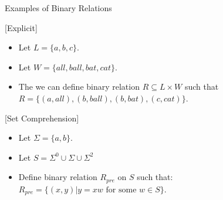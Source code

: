 \documentclass[style=sailor,size=12pt]{powerdot}
\begin{document}
\begin{slide}[bm=,toc=]{Examples of Binary Relations}
\begin{ex}{}[Explicit]~\\
\begin{itemize}
\item Let $L = \{a,b,c\}$.
\item Let $W = \{all,ball,bat,cat\}$.
\item The we can define binary relation $R \subseteq L \times W$ such that 
      $R = \{(a,all),(b,ball),(b, bat), (c,cat)\}$.
\end{itemize}
\end{ex}
\begin{ex}{}[Set Comprehension]~\\
\begin{itemize}
\item Let $\Sigma = \{a,b\}$.
\item Let $S = \Sigma^0 \cup \Sigma \cup \Sigma^2$
\item Define binary relation $R_{pre}$ on $S$ such that:
      $R_{pre} = \{(x,y)| y = xw \text{ for some } w \in S \}$.
\end{itemize}
\end{ex}

\end{slide}
\end{document}

